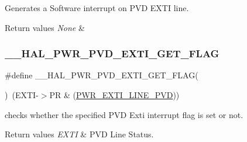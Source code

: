Generates a Software interrupt on P\+VD E\+X\+TI line. 


\begin{DoxyRetVals}{Return values}
{\em None} & \\
\hline
\end{DoxyRetVals}
\mbox{\label{group___p_w_r___exported___macro_ga5e66fa75359b51066e0731ac1e5ae438}} 
\subsubsection{\texorpdfstring{\+\_\+\+\_\+\+H\+A\+L\+\_\+\+P\+W\+R\+\_\+\+P\+V\+D\+\_\+\+E\+X\+T\+I\+\_\+\+G\+E\+T\+\_\+\+F\+L\+AG}{\_\_HAL\_PWR\_PVD\_EXTI\_GET\_FLAG}}
{\footnotesize\ttfamily \#define \+\_\+\+\_\+\+H\+A\+L\+\_\+\+P\+W\+R\+\_\+\+P\+V\+D\+\_\+\+E\+X\+T\+I\+\_\+\+G\+E\+T\+\_\+\+F\+L\+AG(\begin{DoxyParamCaption}{ }\end{DoxyParamCaption})~(E\+X\+TI-\/$>$PR \& (\hyperlink{group___p_w_r___p_v_d___e_x_t_i___line_ga43a49255649e03d2d2b6b12c5c379d2b}{P\+W\+R\+\_\+\+E\+X\+T\+I\+\_\+\+L\+I\+N\+E\+\_\+\+P\+VD}))}



checks whether the specified P\+VD Exti interrupt flag is set or not. 


\begin{DoxyRetVals}{Return values}
{\em E\+X\+TI} & P\+VD Line Status. \\
\hline
\end{DoxyRetVals}
